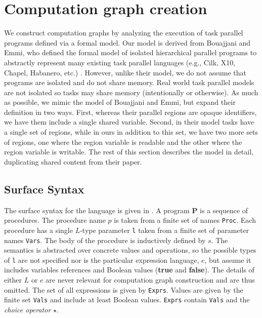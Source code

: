 \section{Computation graph creation} \label{sec:cg}

We construct computation graphs by analyzing the execution of task parallel programs defined via a formal model. Our model is derived from Bouajjani and Emmi, who defined the formal model of isolated hierarchical parallel programs to abstractly represent many existing task parallel languages (e.g., Cilk, X10, Chapel, Habanero, etc.) \cite{bouajjani}. However, unlike their model, we do not assume that programs are isolated and do not share memory. Real world task parallel models are not isolated so tasks may share memory (intentionally or otherwise). As much as possible, we mimic the model of Bouajjani and Emmi, but expand their definition in two ways. First, whereas their parallel regions are opaque identifiers, we have them include a single shared variable. Second, in their model tasks have a single set of regions, while in ours in addition to this set, we have two more sets of regions, one where the region variable is readable and the other where the region variable is writable. The rest of this section describes the model in detail, duplicating shared content from their paper.

\subsection{Surface Syntax}

The surface syntax for the language is given in . A program \textbf{P} is a sequence of procedures. The procedure name $p$ is taken from a finite set of names \texttt{Proc}. Each procedure has a single $L$-type parameter \texttt{l} taken from a finite set of parameter names \texttt{Vars}. The body of the procedure is inductively defined by $s$. The semantics is abstracted over concrete values and operations, so the possible types of \texttt{l} are not specified nor is the particular expression language, $e$, but assume it includes variables references and Boolean values (\textbf{true} and \textbf{false}). The details of either $L$ or $e$ are never relevant for computation graph construction and are thus omitted. The set of all expressions is given by \texttt{Exprs}. Values are given by the finite set \texttt{Vals} and include at least Boolean values. \texttt{Exprs} contain \texttt{Vals} and the \emph{choice operator} $\star$. 

